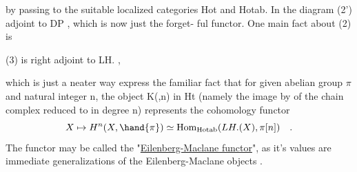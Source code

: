 by passing to the suitable localized categories Hot and Hotab.  In the
diagram (2')   adjoint to DP ,  which is now just the forget-%
ful functor.   One main fact about (2) is

(3) \qquad {} is right adjoint to LH. \quad ,

which is just a neater way  express the familiar fact that for given
abelian group $\pi$ and  natural integer n,  the object K(\hand{$\pi$},n) in  Ht
(namely the image by  of the chain complex\inserted{$\pi[n]$} reduced to \hand{$\pi$} in degree n)
represents the cohomology functor
\[ X \mapsto H^n(X, \hand{\pi}) \simeq \mathrm{Hom}_{\mathrm{Hotab}}(LH.(X), \pi[n]) \quad . \]
The functor  may be called the "\uline{Eilenberg-Maclane functor}",  as it's
values are immediate generalizations of the Eilenberg-Maclane objects
.

